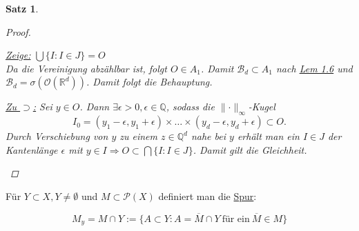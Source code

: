 \documentclass[a4paper]{scrreprt}
\newcommand{\PowerSet}{\mathcal{P}}
\newcommand{\R}{\mathbb{R}}
\newcommand{\Q}{\mathbb{Q}}
\newcommand{\Borel}{\mathcal{B}}
\newcommand{\Bd}{\Borel_d}
\newcommand{\jlabel}[1]{\label{j_#1}}
\newcommand{\jhyperref}[2]{\hyperref[j_#1]{#2}}
\newcommand{\jlink}[1]{\jhyperref{#1}{#1}}
\newcommand{\jspacesmall}{\vspace{4pt}}
\theoremstyle{plain}
\newtheorem{satz}[thm]{Satz}
\theoremstyle{definition}
\begin{document}
{\begin{satz}
\begin{proof}
\begin{enumerate}
                \jspacesmall
                
                \uline{Zeige:} $\bigcup \{I : I \in J\} = O$\\
                Da die Vereinigung abzählbar ist, folgt $O \in A_1$. Damit $\Bd \subset A_1$ nach \jlink{Lem 1.6} und $\Bd = \sigma(\mathcal{O}(\R^d))$. Damit folgt die Behauptung.
                
                \jspacesmall
                
                \uline{Zu $\supset$:} Sei $y \in O$. Dann $\exists \epsilon > 0, \epsilon \in \Q$, sodass die $\lVert \cdot \rVert_\infty$-Kugel
                \begin{displaymath}
                    I_0 = (y_1-\epsilon, y_1 + \epsilon) \times \dots \times (y_d-\epsilon, y_d + \epsilon) \subset O.
                \end{displaymath}
                Durch Verschiebung von $y$ zu einem $z\in \Q^d$ nahe bei $y$ erhält man ein $I\in J$ der Kantenlänge $\epsilon$ mit $y \in I \Rightarrow O \subset \bigcap\{I: I\in J\}$. Damit gilt die Gleichheit.
        \end{enumerate}
    \end{proof}
\end{satz}

Für $Y\subset X, Y \ne \emptyset$ und $M \subset \PowerSet(X)$ definiert man die \uline{Spur}:

\jlabel{(1.1)}
\begin{equation}
    M_y = M \cap Y := \{A \subset Y: A = \overline{M} \cap Y \ \text{für ein} \ \overline{M} \in M\}
\end{equation}

}
\end{document}
